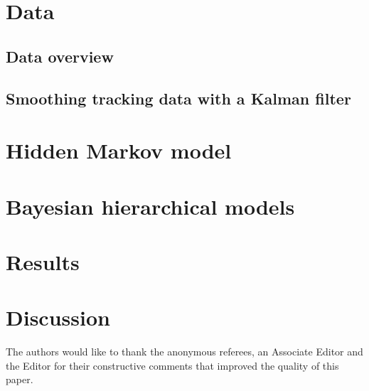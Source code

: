 \documentclass[aoas]{imsart}
\theoremstyle{plain}
\theoremstyle{remark}
\begin{document}
\section{Data} \label{data}

\subsection{Data overview}

\subsection{Smoothing tracking data with a Kalman filter}

\section{Hidden Markov model}

\section{Bayesian hierarchical models} 

\section{Results} \label{results}

\section{Discussion} \label{discussion}



\begin{acks}[Acknowledgments]
The authors would like to thank the anonymous referees, an Associate
Editor and the Editor for their constructive comments that improved the
quality of this paper.
\end{acks}



\begin{supplement}
\end{supplement}
\begin{supplement}
\end{supplement}
\end{document}
